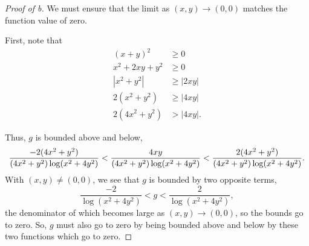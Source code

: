 \documentclass[../quiz3]{subfiles}
\begin{document}
\begin{proof}[Proof of b]
	We must ensure that the limit as $(x,y)\to (0,0)$ matches the function value of zero.

	First, note that \begin{align*}
		{(x+y)}^2   & \ge 0     \\
		x^2+2xy+y^2 & \ge 0     \\
		|x^2+y^2|   & \ge |2xy| \\
		2(x^2+y^2)  & \ge |4xy| \\
		2(4x^2+y^2) & > |4xy|
		.\end{align*}

	Thus, $g$ is bounded above and below,\[
		\frac{-2(4x^2+y^2)}{(4x^2+y^2)\log(x^2+4y^2)} < \frac{4xy}{(4x^2+y^2)\log(x^2+4y^2)} < \frac{2(4x^2+y^2)}{(4x^2+y^2)\log(x^2+4y^2)} \\
		.\]
	With $(x,y)\neq(0,0)$, we see that $g$ is bounded by two opposite terms, \[
		\frac{-2}{\log(x^2+4y^2)} < g < \frac{2}{\log(x^2+4y^2)}
		,\] the denominator of which becomes large as $(x,y)\to (0,0)$, so the bounds go to zero. So, $g$ must also go to zero by being bounded above and below by these two functions which go to zero.
\end{proof}
\end{document}

